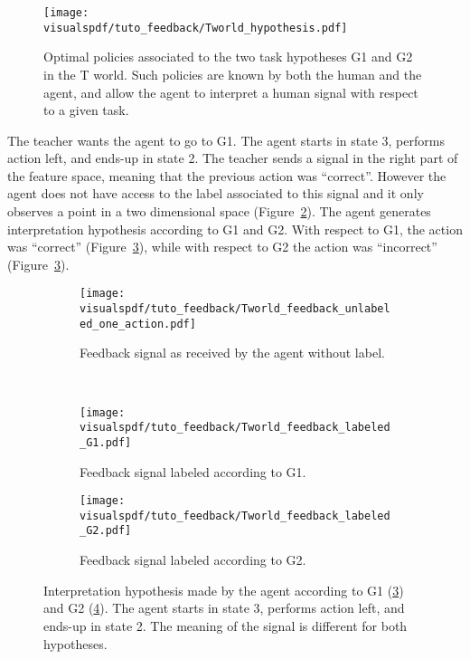 
\begin{figure}[!htbp]
  \centering
  \texttt{[image: \\visualspdf/tuto\_feedback/Tworld\_hypothesis.pdf]}
  \caption{Optimal policies associated to the two task hypotheses G1 and G2 in the T world. Such policies are known by both the human and the agent, and allow the agent to interpret a human signal with respect to a given task.}
  \label{fig:Twolrdpolicies}
\end{figure}

The teacher wants the agent to go to G1. The agent starts in state 3, performs action left, and ends-up in state 2. The teacher sends a signal in the right part of the feature space, meaning that the previous action was ``correct''. However the agent does not have access to the label associated to this signal and it only observes a point in a two dimensional space (Figure~\ref{fig:TworldLabelunknown}). The agent generates interpretation hypothesis according to G1 and G2. With respect to G1, the action was ``correct'' (Figure~\ref{fig:TworldLabelG1}), while with respect to G2 the action was ``incorrect'' (Figure~\ref{fig:TworldLabelG1}).

\begin{figure}[!htbp]
    \centering
    \begin{subfigure}[b]{\tworldsize\columnwidth}
        \centering
        \texttt{[image: \\visualspdf/tuto\_feedback/Tworld\_feedback\_unlabeled\_one\_action.pdf]}
        \caption{Feedback signal as received by the agent without label.}
        \label{fig:TworldLabelunknown}
    \end{subfigure}\\
    \begin{subfigure}[b]{\tworldsize\columnwidth}
        \centering
        \texttt{[image: \\visualspdf/tuto\_feedback/Tworld\_feedback\_labeled\_G1.pdf]}
        \caption{Feedback signal labeled according to G1.}
        \label{fig:TworldLabelG1}
    \end{subfigure}
    \begin{subfigure}[b]{\tworldsize\columnwidth}
        \centering
        \texttt{[image: \\visualspdf/tuto\_feedback/Tworld\_feedback\_labeled\_G2.pdf]}
        \caption{Feedback signal labeled according to G2.}
        \label{fig:TworldLabelG2}
    \end{subfigure}
    \caption{Interpretation hypothesis made by the agent according to G1 (\ref{fig:TworldLabelG1}) and G2 (\ref{fig:TworldLabelG2}). The agent starts in state 3, performs action left, and ends-up in state 2. The meaning of the signal is different for both hypotheses.}
    \label{fig:TworldLabelOneStep}
\end{figure}

